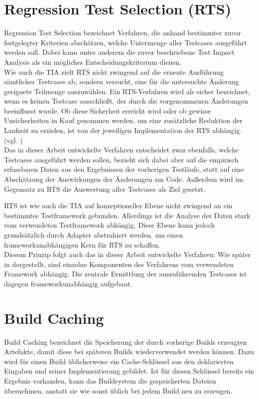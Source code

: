 \section{Regression Test Selection (RTS)}\label{RTS}
Regression Test Selection bezeichnet Verfahren, die anhand bestimmter zuvor festgelegter Kriterien abschätzen, welche Untermenge aller Testcases ausgeführt werden soll. Dabei kann unter anderem die zuvor beschriebene Test Impact Analysis als ein mögliches Entscheidungskriterium dienen.\\
Wie auch die TIA zielt RTS nicht zwingend auf die erneute Ausführung sämtlicher Testcases ab, sondern versucht, eine für die untersuchte Änderung geeignete Teilmenge auszuwählen. Ein RTS-Verfahren wird als sicher bezeichnet, wenn es keinen Testcase ausschließt, der durch die vorgenommenen Änderungen beeinflusst wurde. Ob diese Sicherheit erreicht wird oder ob gewisse Unsicherheiten in Kauf genommen werden, um eine zusätzliche Reduktion der Laufzeit zu erzielen, ist von der jeweiligen Implementation der RTS abhängig. \\
(vgl. \textcite[177f.]{rothermelRTS})\\
Das in dieser Arbeit entwickelte Verfahren entscheidet zwar ebenfalls, welche Testcases ausgeführt werden sollen, bezieht sich dabei aber auf die empirisch erfassbaren Daten aus den Ergebnissen der vorherigen Testläufe, statt auf eine Abschätzung der Auswirkungen der Änderungen am Code. Außerdem wird im Gegensatz zu RTS die Auswertung aller Testcases als Ziel gesetzt. 

RTS ist wie auch die TIA auf konzeptioneller Ebene nicht zwingend an ein bestimmtes
Testframework gebunden. Allerdings ist die Analyse der Daten stark vom verwendeten Testframework abhängig. Diese Ebene kann jedoch grundsätzlich durch Adapter abstrahiert werden, um einen frameworkunabhängigen Kern für RTS zu schaffen.\\
Diesem Prinzip folgt auch das in dieser Arbeit entwickelte Verfahren: Wie später in  dargestellt, sind einzelne Komponenten des Verfahrens vom verwendeten Framework abhängig. Die zentrale Ermittlung der auszuführenden Testcases ist dagegen frameworkunabhängig aufgebaut.

\section{Build Caching}
Build Caching bezeichnet die Speicherung der durch vorherige Builds erzeugten Artefakte, damit diese bei späteren Builds wiederverwendet werden können. Dazu wird für einen Build üblicherweise ein Cache-Schlüssel aus den deklarierten Eingaben und seiner Implementierung gebildet. Ist für diesen Schlüssel bereits ein Ergebnis vorhanden, kann das Buildsystem die gespeicherten Dateien übernehmen, anstatt sie wie sonst üblich bei jedem Build neu zu erzeugen. 

